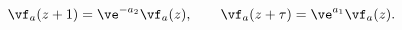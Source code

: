 \begin{equation}
\vf_a(z+1)=\ve^{-a_2}\vf_a(z) ,\qquad
\vf_a(z+\tau)=\ve^{a_1}\vf_a(z).
\label{vf}
\end{equation}

